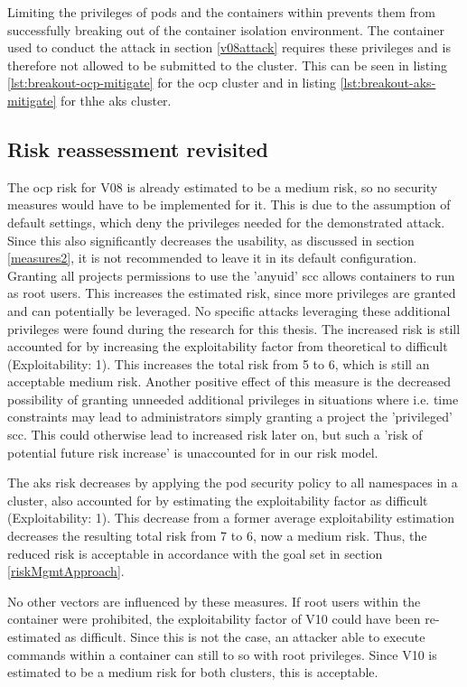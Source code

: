 Limiting the privileges of pods and the containers within prevents them from successfully breaking out of the container isolation environment.
The container used to conduct the attack in section \ref{v08attack} requires these privileges and is therefore not allowed to be submitted to the cluster. This can be seen in listing \ref{lst:breakout-ocp-mitigate} for the \gls{ocp} cluster and in listing \ref{lst:breakout-aks-mitigate} for thhe \gls{aks} cluster.

\subsection{Risk reassessment revisited} \label{reassess2}

The \gls{ocp} risk for V08 is already estimated to be a medium risk, so no security measures would have to be implemented for it. This is due to the assumption of default settings, which deny the privileges needed for the demonstrated attack. Since this also significantly decreases the usability, as discussed in section \ref{measures2}, it is not recommended to leave it in its default configuration.
Granting all projects permissions to use the 'anyuid' \gls{scc} allows containers to run as root users. This increases the estimated risk, since more privileges are granted and can potentially be leveraged. No specific attacks leveraging these additional privileges were found during the research for this thesis. The increased risk is still accounted for by increasing the exploitability factor from theoretical to difficult (Exploitability: 1). This increases the total risk from 5 to 6, which is still an acceptable medium risk. Another positive effect of this measure is the decreased possibility of granting unneeded additional privileges in situations where i.e. time constraints may lead to administrators simply granting a project the 'privileged' \gls{scc}. This could otherwise lead to increased risk later on, but such a 'risk of potential future risk increase' is unaccounted for in our risk model.

The \gls{aks} risk decreases by applying the pod security policy to all namespaces in a cluster, also accounted for by estimating the exploitability factor as difficult (Exploitability: 1). This decrease from a former average exploitability estimation decreases the resulting total risk from 7 to 6, now a medium risk.
Thus, the reduced risk is acceptable in accordance with the goal set in section \ref{riskMgmtApproach}.

No other vectors are influenced by these measures. If root users within the container were prohibited, the exploitability factor of V10 could have been re-estimated as difficult. Since this is not the case, an attacker able to execute commands within a container can still to so with root privileges. Since V10 is estimated to be a medium risk for both clusters, this is acceptable.

